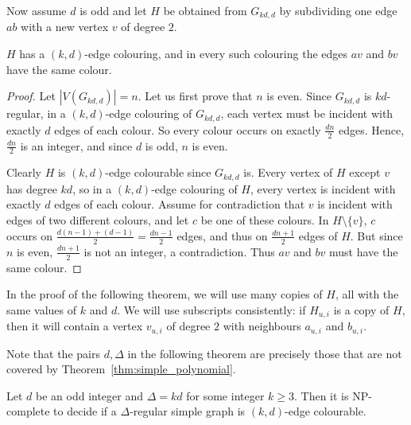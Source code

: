 Now assume $d$ is odd and let $H$ be obtained from $G_{kd,d}$ by subdividing one edge $ab$ with a new vertex $v$ of degree $2$. 

\begin{lemma}\label{lem:H_av_bv_same_colour}
$H$ has a $(k,d)$-edge colouring, and in every such colouring the edges $av$ and $bv$ have the same colour.  
\end{lemma}

\begin{proof}
Let $|V(G_{kd,d})|=n$. 
Let us first prove that $n$ is even. 
Since $G_{kd,d}$ is $kd$-regular, in a $(k,d)$-edge colouring of $G_{kd,d}$, each vertex must be incident with exactly $d$ edges of each colour. So every colour occurs on exactly $\frac{dn}{2}$ edges. Hence, $\frac{dn}{2}$ is an integer, and since $d$ is odd, $n$ is even.  

Clearly $H$ is $(k,d)$-edge colourable since $G_{kd,d}$ is. 
Every vertex of $H$ except $v$ has degree $kd$, so in a $(k,d)$-edge colouring of $H$,  every vertex is incident with exactly $d$ edges of each colour. 
Assume for contradiction that $v$ is incident with edges of two different  colours, and let $c$ be one of these colours. 
In $H\setminus \{v\}$, $c$ occurs on $\frac{d(n-1) + (d-1)}{2}= \frac{dn-1}{2} $ edges, and thus on $\frac{dn+1}{2}$ edges of $H$. But since $n$ is even, $\frac{dn+1}{2}$ is not an integer, a contradiction. 
Thus $av$ and $bv$ must have the same colour. 
\end{proof}



In the proof of the following theorem, we will use many copies of $H$, all with the same values of $k$ and $d$. We will use subscripts consistently: if $H_{u,i}$ is a copy of $H$, then it will contain a vertex $v_{u,i}$ of degree $2$ with neighbours $a_{u,i}$ and $b_{u,i}$.

Note that the pairs $d, \Delta$ in the following theorem are precisely those that are not covered by Theorem~\ref{thm:simple_polynomial}.

\begin{theorem}\label{thm:NP}
Let $d$ be an odd integer and $\Delta = kd$ for some integer $k \geq 3$. Then it is NP-complete to decide if a $\Delta$-regular simple graph is $(k,d)$-edge colourable.
\end{theorem}

